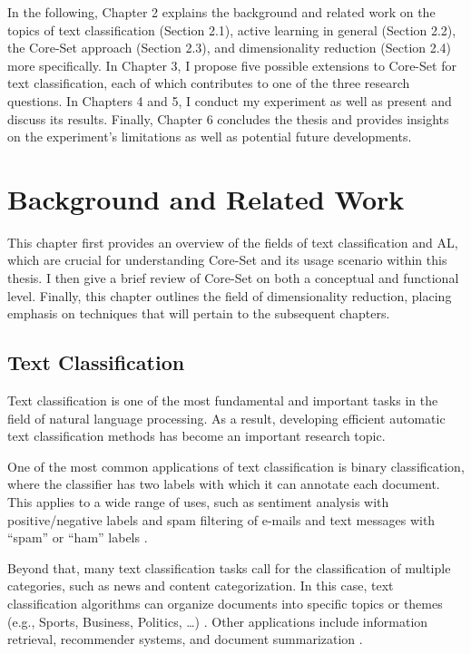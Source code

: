 \documentclass[english,bachelor,ul]{webisthesis} %
\begin{document}
In the following, Chapter 2 explains the background and related work on the topics of text classification (Section 2.1), active learning in general (Section 2.2), the Core-Set approach (Section 2.3), and dimensionality reduction (Section 2.4) more specifically. In Chapter 3, I propose five possible extensions to Core-Set for text classification, each of which contributes to one of the three research questions. In Chapters 4 and 5, I conduct my experiment as well as present and discuss its results. Finally, Chapter 6 concludes the thesis and provides insights on the experiment's limitations as well as potential future developments. 

\chapter{Background and Related Work}

This chapter first provides an overview of the fields of text classification and AL, which are crucial for understanding Core-Set and its usage scenario within this thesis. I then give a brief review of Core-Set on both a conceptual and functional level. Finally, this chapter outlines the field of dimensionality reduction, placing emphasis on techniques that will pertain to the subsequent chapters.

\section{Text Classification}

Text classification is one of the most fundamental and important tasks in the field of natural language processing. As a result, developing efficient automatic text classification methods has become an important research topic. 

One of the most common applications of text classification is binary classification, where the classifier has two labels with which it can annotate each document. This applies to a wide range of uses, such as sentiment analysis with positive/negative labels \citep{DBLP:books/sp/mining2012/LiuZ12} and spam filtering of e-mails and text messages with ``spam'' or ``ham'' labels \citep{10.1145/2034691.2034742}. 

Beyond that, many text classification tasks call for the classification of multiple categories, such as news and content categorization. In this case, text classification algorithms can organize documents into specific topics or themes (e.g., Sports, Business, Politics, \dots) \citep{DBLP:journals/csur/Sebastiani02}. Other applications include information retrieval, recommender systems, and document summarization \citep{DBLP:journals/information/KowsariMHMBB19}.
\end{document}
